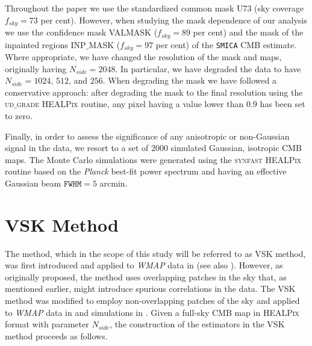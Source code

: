 Throughout the paper we use the standardized common mask U73 (sky coverage $f_{sky} = 73$ per cent). However, when studying the mask dependence of our analysis we use the confidence mask VALMASK ($f_{sky} = 89$ per cent) and the mask of the inpainted regions INP$\_$MASK ($f_{sky} = 97$ per cent) of the \texttt{SMICA} CMB estimate. Where appropriate, we have changed the resolution of the mask and maps, originally having $N_{side}=2048$. In particular, we have degraded the data to have $N_{side}=1024,\, 512$, and $256$. When degrading the mask we have followed a conservative approach: after degrading the mask to the final resolution using the \textsc{ud$\_$grade HEALPix} routine, any pixel having a value lower than $0.9$ has been set to zero. 

Finally, in order to assess the significance of any anisotropic or non-Gaussian signal in the data, we resort to a set of $2000$ simulated Gaussian, isotropic CMB maps. The Monte Carlo simulations were generated using the \textsc{synfast HEALPix} routine based on the \textit{Planck} best-fit power spectrum and having an effective Gaussian beam $\texttt{FWHM}=5$ arcmin.

\section{VSK Method}
\label{s:method}

The method, which in the scope of this study will be referred to as VSK method, was first introduced and applied to \textit{WMAP} data in \cite{Bernui:2008ei}  (see also \cite{Bernui:2009wq,Bernui:2011yj}). However, as originally proposed, the method uses overlapping patches in the sky that, as mentioned earlier, might introduce spurious correlations in the data. The VSK method was modified to employ non-overlapping patches of the sky and applied to \textit{WMAP} data in \cite{Cardona:2013pqa} and simulations in \cite{Cardona:2013fxa}. Given a full-sky CMB map in \textsc{HEALPix} format with parameter $N_{side}$, the construction of the estimators in the VSK method proceeds as follows. 

